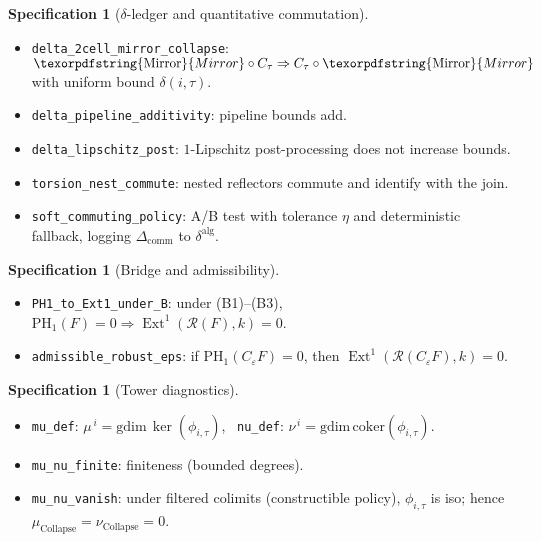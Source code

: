 \documentclass[11pt]{article}
\numberwithin{equation}{section}
\theoremstyle{plain}
\theoremstyle{definition}
\theoremstyle{remark}
\DeclareMathOperator{\Ext}{Ext}
\theoremstyle{plain}
\theoremstyle{definition}
\numberwithin{equation}{section}
\theoremstyle{definition}
\newtheorem{specification}[theorem]{Specification}
\DeclareRobustCommand{\muc}{\mu_{\mathrm{Collapse}}}
\DeclareRobustCommand{\nuc}{\nu_{\mathrm{Collapse}}}
\DeclareRobustCommand{\Mirror}{\texorpdfstring{\ensuremath{\operatorname{Mirror}}}{Mirror}}
\numberwithin{equation}{section}
\theoremstyle{plain}
\theoremstyle{definition}
\theoremstyle{remark}
\providecommand{\muc}{\mu_{\mathrm{Collapse}}}
\providecommand{\nuc}{\nu_{\mathrm{Collapse}}}
\begin{document}
\begin{specification}[$\delta$-ledger and quantitative commutation]\label{spec:delta-ledger}
\begin{itemize}
  \item \texttt{delta\_2cell\_mirror\_collapse}: $\Mirror\circ C_\tau \Rightarrow C_\tau\circ \Mirror$ with uniform bound $\delta(i,\tau)$.
  \item \texttt{delta\_pipeline\_additivity}: pipeline bounds add.
  \item \texttt{delta\_lipschitz\_post}: $1$-Lipschitz post-processing does not increase bounds.
  \item \texttt{torsion\_nest\_commute}: nested reflectors commute and identify with the join.
  \item \texttt{soft\_commuting\_policy}: A/B test with tolerance $\eta$ and deterministic fallback, logging $\Delta_{\mathrm{comm}}$ to $\delta^{\mathrm{alg}}$.
\end{itemize}
\end{specification}

\begin{specification}[Bridge and admissibility]\label{spec:bridge}
\begin{itemize}
  \item \texttt{PH1\_to\_Ext1\_under\_B}: under (B1)–(B3), $\mathrm{PH}_1(F)=0\Rightarrow \Ext^1(\mathcal{R}(F),k)=0$.
  \item \texttt{admissible\_robust\_eps}: if $\mathrm{PH}_1(C_\varepsilon F)=0$, then $\Ext^1(\mathcal{R}(C_\varepsilon F),k)=0$.
\end{itemize}
\end{specification}

\begin{specification}[Tower diagnostics]\label{spec:mu-nu}
\begin{itemize}
  \item \texttt{mu\_def}: $\mu^{\,i}=\mathrm{gdim}\,\ker(\phi_{i,\tau})$, \ \texttt{nu\_def}: $\nu^{\,i}=\mathrm{gdim}\,\mathrm{coker}(\phi_{i,\tau})$.
  \item \texttt{mu\_nu\_finite}: finiteness (bounded degrees).
  \item \texttt{mu\_nu\_vanish}: under filtered colimits (constructible policy), $\phi_{i,\tau}$ is iso; hence $\muc=\nuc=0$.
\end{itemize}
\end{specification}
\end{document}
